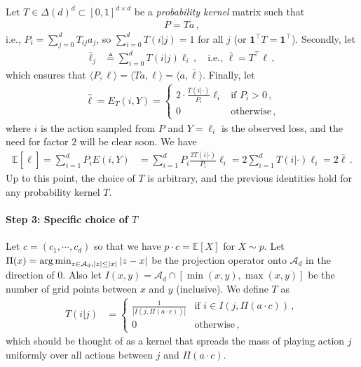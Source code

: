 \documentclass{article}
\theoremstyle{plain}
\theoremstyle{definition}
\newcommand{\argmin}{\operatornamewithlimits{arg\,min}}
\newcommand{\E}{\mathbb E}
\newcommand{\cA}{\mathcal A}
\newcommand{\hl}{\hat{\ell}\xspace}
\begin{document}
Let $T \in \Delta(d)^d \subset [0,1]^{d \times d}$ be a \emph{probability kernel} matrix such that
\begin{align*}
    P = T a\,,
\end{align*}
i.e., $P_i = \sum_{j=0}^{d} T_{ij} a_j$, so $\sum_{i=0}^{d} T(i | j) = 1$ for all $j$ (or $\mathbf{1}^\top T = \mathbf{1}^\top$).
Secondly, let
\begin{align*}
    \bar{\ell}_j & \triangleq
    \sum_{i=0}^{d} T(i | j) \ell_i\,,
    \quad
    \text{i.e., } \bar{\ell} = T^\top \ell\,,
\end{align*}
which ensures that $\langle P, \ell \rangle = \langle T a, \ell \rangle = \langle a, \bar{\ell} \rangle$.
Finally, let
\begin{align*}
    \hl = E_T(i, Y) = \begin{cases}
                          2 \cdot \frac{T(i|\cdot)}{P_i} \ell_i & \text{if } P_i > 0\,, \\
                          0                                     & \text{otherwise}\,,
                      \end{cases}
\end{align*}
where $i$ is the action sampled from $P$ and $Y = \ell_i$ is the observed loss,
and the need for factor $2$ will be clear soon.
We have
\begin{align*}
    \E[\hl]
    =
    \sum_{i=1}^{d} P_i E(i, Y) & =
    \sum_{i=1}^{d} P_i \frac{2 T(i|\cdot)}{P_i} \ell_i =
    2 \sum_{i=1}^{d} T(i|\cdot) \ell_i
    = 2 \bar{\ell}\,.
\end{align*}
Up to this point, the choice of $T$ is arbitrary, and the previous identities hold for any probability kernel $T$.

\paragraph{Step 3: Specific choice of $T$}
Let $c = (c_1, \cdots, c_d)$ so that we have $p \cdot c = \E[X]$ for $X \sim p$.
Let $\Pi(x) = \argmin_{z \in \cA_d, |z| \leq |x|} |z - x|$ be the projection operator onto $\cA_d$
in the direction of $0$.
Also let $I(x, y) = \cA_d \cap [\min(x,y), \max(x,y)]$ be the number of grid points
between $x$ and $y$ (inclusive).
We define $T$ as
\begin{align*}
    T(i | j) & =
    \begin{cases}
        \frac{1}{|I(j, \Pi(a\cdot c))|} & \text{if } i \in I(j, \Pi(a\cdot c))\,, \\
        0                               & \text{otherwise}\,,
    \end{cases}
\end{align*}
which should be thought of as a kernel that spreads the mass of playing action $j$
uniformly over all actions between $j$ and $\Pi(a\cdot c)$.
\end{document}
